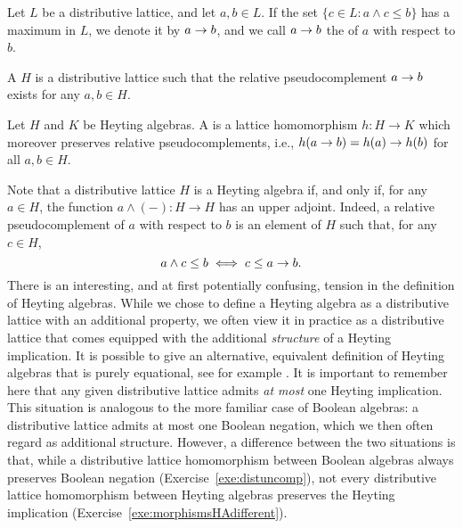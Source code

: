 \begin{definition}
Let $L$ be a distributive lattice, and let $a, b \in L$. If the set $\{c \in L : a \wedge c \leq b\}$ has a maximum in $L$, we denote it by $a \to b$, and we call $a \to b$ the  of $a$ with respect to $b$. 

A  $H$ is a distributive lattice such that the relative pseudocomplement $a \to b$ exists for any $a, b \in H$.

Let $H$ and $K$ be Heyting algebras. A  is a lattice homomorphism $h \colon H \to K$ which moreover preserves relative pseudocomplements, i.e., $h(a \to b) = h(a) \to h(b)$ for all $a, b \in H$.
\end{definition}

Note that a distributive lattice $H$ is a Heyting algebra if, and only if, for any $a \in H$, the function $a \wedge (-) \colon H \to H$ has an upper adjoint. Indeed, a relative pseudocomplement of $a$ with respect to $b$ is an element of $H$ such that, for any $c \in H$, 
\begin{equation}\label{eq:heyting-adj} a \wedge c \leq b \iff c \leq a \to b.
\end{equation}
There is an interesting, and at first potentially confusing, tension in the
definition of Heyting algebras. While we chose to define a Heyting algebra as a
distributive lattice with an additional property, we often view it in practice as a
distributive lattice that comes equipped with the additional \emph{structure} of
a Heyting implication. It is possible to give an
alternative, equivalent definition of Heyting algebras that is purely
equational, see for example \cite[II.1, Example 11]{BurSan2000}.
It is important to remember here that any given distributive
lattice admits \emph{at most} one Heyting implication. This situation is
analogous to the more familiar case of Boolean algebras: a distributive lattice
admits at most one Boolean negation, which we then often regard as additional
structure. However, a difference between the two situations is that, while a
distributive lattice homomorphism between Boolean algebras always preserves
Boolean negation (Exercise~\ref{exe:distuncomp}), not every distributive lattice
homomorphism between Heyting algebras preserves the Heyting implication
(Exercise~\ref{exe:morphismsHAdifferent}). 

